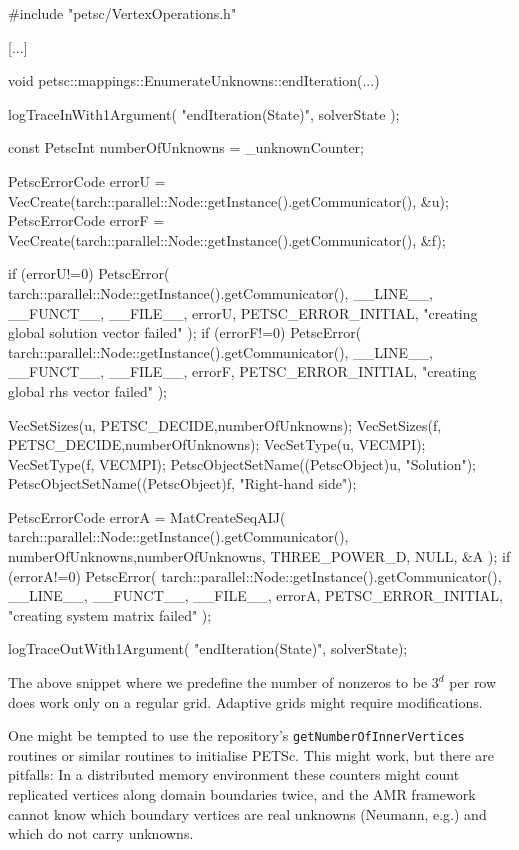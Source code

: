 \begin{code}
#include "petsc/VertexOperations.h"

[...]

void petsc::mappings::EnumerateUnknowns::endIteration(...) {
 logTraceInWith1Argument( "endIteration(State)", solverState );

 const PetscInt numberOfUnknowns = _unknownCounter;

 PetscErrorCode errorU = VecCreate(tarch::parallel::Node::getInstance().getCommunicator(), &u);
 PetscErrorCode errorF = VecCreate(tarch::parallel::Node::getInstance().getCommunicator(), &f);

 if (errorU!=0) {
   PetscError( tarch::parallel::Node::getInstance().getCommunicator(),
     __LINE__,  __FUNCT__,  __FILE__, errorU,  PETSC_ERROR_INITIAL,
     "creating global solution vector failed" );
 }
 if (errorF!=0) {
   PetscError( tarch::parallel::Node::getInstance().getCommunicator(),
     __LINE__,  __FUNCT__,  __FILE__, errorF,  PETSC_ERROR_INITIAL,
     "creating global rhs vector failed" );
 }

 VecSetSizes(u, PETSC_DECIDE,numberOfUnknowns);
 VecSetSizes(f, PETSC_DECIDE,numberOfUnknowns);
 VecSetType(u, VECMPI);
 VecSetType(f, VECMPI);
 PetscObjectSetName((PetscObject)u, "Solution");
 PetscObjectSetName((PetscObject)f, "Right-hand side");

 PetscErrorCode errorA = MatCreateSeqAIJ(
   tarch::parallel::Node::getInstance().getCommunicator(),
   numberOfUnknowns,numberOfUnknowns,
   THREE_POWER_D, NULL,
   &A
 );
 if (errorA!=0) {
   PetscError( tarch::parallel::Node::getInstance().getCommunicator(),
     __LINE__,  __FUNCT__,  __FILE__, errorA,  PETSC_ERROR_INITIAL,
     "creating system matrix failed" );
 }

 logTraceOutWith1Argument( "endIteration(State)", solverState);
}
\end{code}


\begin{remark}
 The above snippet where we predefine the number of nonzeros to be $3^d$ per
 row does work only on a regular grid. Adaptive grids might require
 modifications.
\end{remark}


\begin{remark}
 One might be tempted to use the repository's \texttt{getNumberOfInnerVertices}
 routines or similar routines to initialise PETSc.
 This might work, but there are pitfalls: In a distributed memory environment
 these counters might count replicated vertices along domain boundaries twice,
 and the AMR framework cannot know which boundary vertices are real unknowns
 (Neumann, e.g.) and which do not carry unknowns.
\end{remark}



